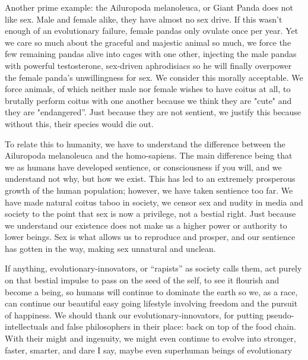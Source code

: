Another prime example: the Ailuropoda melanoleuca, or Giant Panda does not like 
sex. Male and female alike, they have almost no sex drive. If this wasn't enough 
of an evolutionary failure, female pandas only ovulate once per year. Yet we 
care so much about the graceful and majestic animal so much, we force the few 
remaining pandas alive into cages with one other, injecting the male pandas with 
powerful testosterone, sex-driven aphrodisiacs so he will finally overpower the 
female panda's unwillingness for sex. We consider this morally acceptable. We 
force animals, of which neither male nor female wishes to have coitus at all, to 
brutally perform coitus with one another because we think they are "cute" and 
they are "endangered”. Just because they are not sentient, we justify this 
because without this, their species would die out.


To relate this to humanity, we have to understand the difference between the 
Ailuropoda melanoleuca and the homo-sapiens. The main difference being that we 
as humans have developed sentience, or consciousness if you will, and we 
understand not why, but how we exist. This has led to an extremely prosperous 
growth of the human population; however, we have taken sentience too far. We 
have made natural coitus taboo in society, we censor sex and nudity in media and 
society to the point that sex is now a privilege, not a bestial right. Just 
because we understand our existence does not make us a higher power or authority 
to lower beings. Sex is what allows us to reproduce and prosper, and our 
sentience has gotten in the way, making sex unnatural and unclean.


If anything, evolutionary-innovators, or “rapists” as society calls them, act 
purely on that bestial impulse to pass on the seed of the self, to see it 
flourish and become a being, so humans will continue to dominate the earth so 
we, as a race, can continue our beautiful easy going lifestyle involving freedom 
and the pursuit of happiness. We should thank our evolutionary-innovators, for 
putting pseudo-intellectuals and false philosophers in their place: back on top 
of the food chain. With their might and ingenuity, we might even continue to 
evolve into stronger, faster, smarter, and dare I say, maybe even superhuman 
beings of evolutionary 